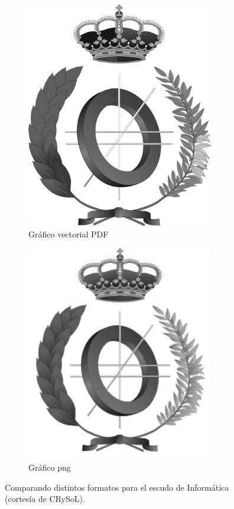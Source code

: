 \documentclass[ 		%
	11pt,				%
	a4paper,			%
	twoside,			%
	openright,			%
	final       		%
]{book}
\begin{document}
\begin{figure}[hbt]
	\centering
	\begin{subfigure}[b]{0.4\textwidth}
		\centering
		\includegraphics[width=0.9\textwidth]{escudoInfBW.pdf}
		\caption{Gráfico vectorial \textsf{PDF}}\label{fig:escudoPDF}
	\end{subfigure}
	\begin{subfigure}[b]{0.4\textwidth}
		\centering
		\includegraphics[width=0.9\textwidth]{escudoInfBW.png}
		\caption{Gráfico png}\label{fig:escudoPNG}
	\end{subfigure}
	\caption[Comparación \textsf{PDF} y png]{Comparando distintos formatos para el escudo de Informática (cortesía de CRySoL).}
	\label{fig:escudo}
\end{figure}
\end{document}
